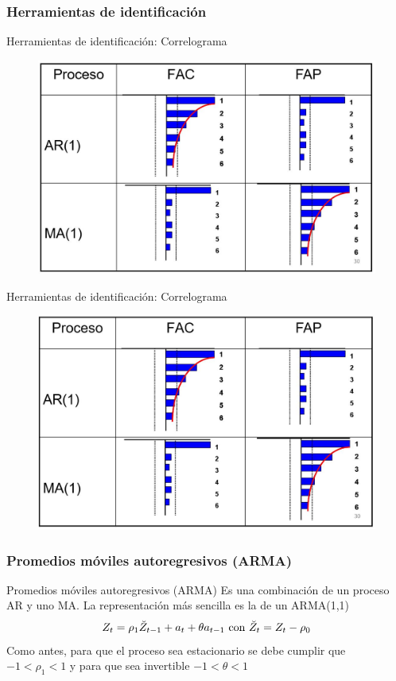 \subsubsection{Herramientas de identificación}
\begin{frame}{Herramientas de identificación: Correlograma}
	\centering
	\begin{figure}
		\includegraphics[width = 0.85\linewidth]{fig/figure10.jpg}
	\end{figure}
\end{frame}
\begin{frame}{Herramientas de identificación: Correlograma}
	\centering
	\begin{figure}
		\includegraphics[width = 0.85\linewidth]{fig/figure11.jpg}
	\end{figure}
\end{frame}

\subsubsection{Promedios móviles autoregresivos (ARMA)}
\begin{frame}{Promedios móviles autoregresivos (ARMA)}
	Es una combinación de un proceso AR y uno MA. La representación más sencilla es la de un ARMA(1,1)
		$$Z_t = \rho_1\breve{Z}_{t-1} +a_t +\theta a_{t-1} \textup{ con }  \breve{Z}_t = Z_t - \rho_0$$
	Como antes, para que el proceso sea estacionario se debe cumplir que $-1<\rho_1<1$ y para que sea invertible $-1<\theta<1$
\end{frame}
